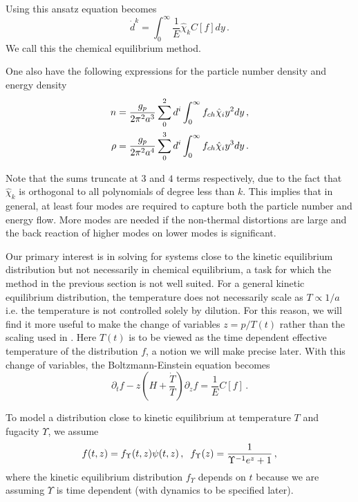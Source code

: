 Using this ansatz  equation  becomes
\begin{equation}\label{eq:ChemEquilibMethod}
\dot{d}^k=\int_0^\infty\frac{1}{E}\hat{\chi}_k C[f]dy\,.
\end{equation}
We call this the chemical equilibrium method.

One also have the following expressions for the particle number density and energy density
\begin{align}\label{freeStreamMoments}
n&=\frac{g_p}{2\pi^2 a^3}\sum_0^2 d^i\int_0^\infty f_{ch}\hat\chi_i y^2dy\,,\\
\rho&=\frac{g_p}{2\pi^2a^4}\sum_0^3 d^i\int_0^\infty f_{ch}\hat\chi_i y^3dy\,.\notag
\end{align}

Note that the sums truncate at $3$ and $4$ terms respectively, due to the fact that $\hat\chi_k$ is orthogonal to all polynomials of degree less than $k$. This implies that in general, at least four modes are required to capture both the particle number and energy flow. More modes are needed if the non-thermal distortions are large and the back reaction of higher modes on lower modes is significant.

\label{kineticEqApproach}
Our primary interest is in solving  for systems close to the kinetic equilibrium distribution  but not necessarily in chemical equilibrium, a task for which the method in the previous section is not well suited. For a general kinetic equilibrium distribution, the temperature does not necessarily scale as $T\propto 1/a$ i.e. the temperature is not controlled solely by dilution.  For this reason, we will find it more useful to make the change of variables $z=p/T(t)$ rather than the scaling used in .  Here $T(t)$ is to be viewed as the time dependent effective temperature of the distribution $f$, a notion we will make precise later.  With this change of variables, the Boltzmann-Einstein equation becomes
\begin{equation}\label{TBoltzmann}
\partial_t f-z\left(H+\frac{\dot T}{T}\right)\partial_z f=\frac{1}{E}C[f]\,.
\end{equation}


To model a distribution close to kinetic equilibrium at temperature $T$ and fugacity $\Upsilon$, we assume
\begin{equation}\label{kineticApprox}
f(t,z)= f_\Upsilon (t,z)\psi(t,z)\,,\hspace{2mm} f_\Upsilon(z)=\frac{1}{\Upsilon^{-1}e^z+1}\,,
\end{equation}
where the kinetic equilibrium distribution $f_\Upsilon $ depends on $t$ because we are assuming $\Upsilon$ is time dependent (with dynamics to be specified later). 

